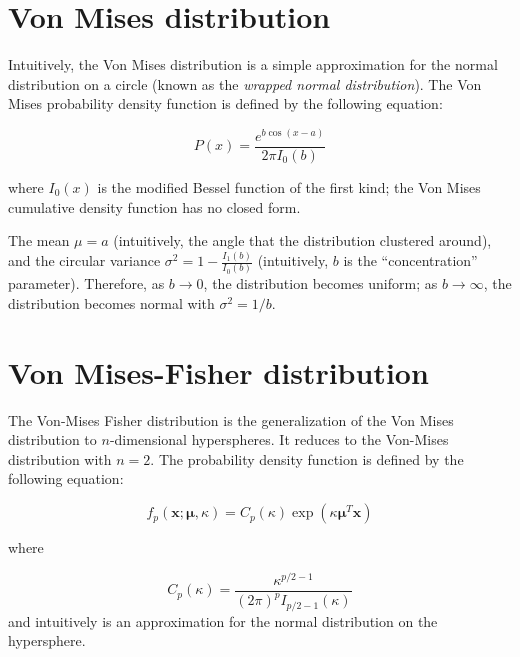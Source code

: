 \documentclass[../tech_report_1.tex]{subfiles}
\begin{document}
\section{Von Mises distribution}

Intuitively, the Von Mises distribution \cite{wolfram_von_mises} is
a simple approximation for the normal distribution on a circle (known
as the \textit{wrapped normal distribution}). The Von Mises probability
density function is defined by the following equation:

\[
P(x)=\frac{{e^{b\cos(x-a)}}}{2\pi I_{0}(b)}
\]


where $I_{0}(x)$ is the modified Bessel function of the first kind;
the Von Mises cumulative density function has no closed form.

The mean $\mu=a$ (intuitively, the angle that the distribution clustered
around), and the circular variance $\sigma^{2}=1-\frac{{I_{1}(b)}}{I_{0}(b)}$
(intuitively, $b$ is the ``concentration'' parameter). Therefore,
as $b\rightarrow0$, the distribution becomes uniform; as $b\rightarrow\infty$,
the distribution becomes normal with $\sigma^{2}=1/b$.


\section{Von Mises-Fisher distribution}

The Von-Mises Fisher distribution is the generalization of the Von
Mises distribution to $n$-dimensional hyperspheres. It reduces to
the Von-Mises distribution with $n=2$. The probability density function
is defined by the following equation:

\[
f_{p}(\boldsymbol{x};\boldsymbol{\mu},\kappa)=C_{p}(\kappa)\exp(\kappa\boldsymbol{\mu}^{T}\boldsymbol{x})
\]


where

\[
C_{p}(\kappa)=\frac{\kappa^{p/2-1}}{(2\pi)^{p}I_{p/2-1}(\kappa)}
\]
 and intuitively is an approximation for the normal distribution on
the hypersphere.

\end{document}
